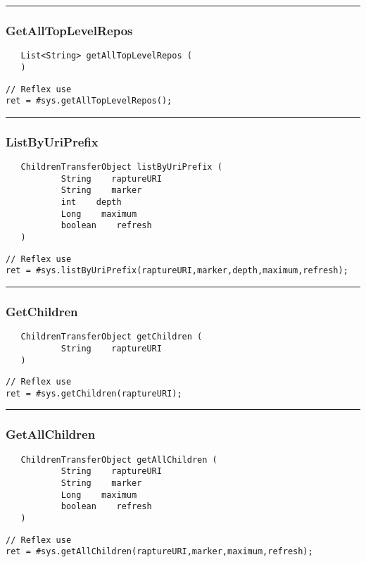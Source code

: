 \rule{15cm}{2pt}
\subsubsection{GetAllTopLevelRepos}
\label{Api:GetAllTopLevelRepos}
\begin{verbatim}
   List<String> getAllTopLevelRepos (
   )
\end{verbatim}
\begin{lstlisting}[language=reflex]
// Reflex use
ret = #sys.getAllTopLevelRepos();
\end{lstlisting}



\rule{15cm}{2pt}
\subsubsection{ListByUriPrefix}
\label{Api:ListByUriPrefix}
\begin{verbatim}
   ChildrenTransferObject listByUriPrefix (
           String    raptureURI
           String    marker
           int    depth
           Long    maximum
           boolean    refresh
   )
\end{verbatim}
\begin{lstlisting}[language=reflex]
// Reflex use
ret = #sys.listByUriPrefix(raptureURI,marker,depth,maximum,refresh);
\end{lstlisting}



\rule{15cm}{2pt}
\subsubsection{GetChildren}
\label{Api:GetChildren}
\begin{verbatim}
   ChildrenTransferObject getChildren (
           String    raptureURI
   )
\end{verbatim}
\begin{lstlisting}[language=reflex]
// Reflex use
ret = #sys.getChildren(raptureURI);
\end{lstlisting}



\rule{15cm}{2pt}
\subsubsection{GetAllChildren}
\label{Api:GetAllChildren}
\begin{verbatim}
   ChildrenTransferObject getAllChildren (
           String    raptureURI
           String    marker
           Long    maximum
           boolean    refresh
   )
\end{verbatim}
\begin{lstlisting}[language=reflex]
// Reflex use
ret = #sys.getAllChildren(raptureURI,marker,maximum,refresh);
\end{lstlisting}



